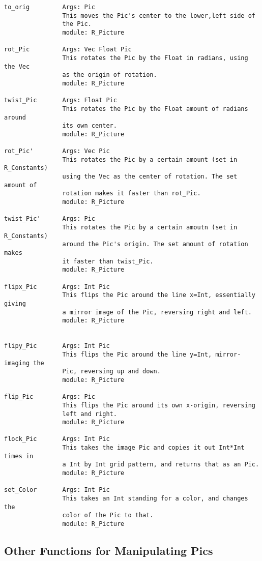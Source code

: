 \begin{verbatim}
to_orig         Args: Pic
                This moves the Pic's center to the lower,left side of
                the Pic. 
                module: R_Picture

rot_Pic         Args: Vec Float Pic
                This rotates the Pic by the Float in radians, using the Vec
                as the origin of rotation.
                module: R_Picture

twist_Pic       Args: Float Pic
                This rotates the Pic by the Float amount of radians around
                its own center. 
                module: R_Picture

rot_Pic'        Args: Vec Pic
                This rotates the Pic by a certain amount (set in R_Constants)
                using the Vec as the center of rotation. The set amount of
                rotation makes it faster than rot_Pic.
                module: R_Picture

twist_Pic'      Args: Pic
                This rotates the Pic by a certain amoutn (set in R_Constants)
                around the Pic's origin. The set amount of rotation makes
                it faster than twist_Pic.
                module: R_Picture

flipx_Pic       Args: Int Pic
                This flips the Pic around the line x=Int, essentially giving
                a mirror image of the Pic, reversing right and left.
                module: R_Picture


flipy_Pic       Args: Int Pic
                This flips the Pic around the line y=Int, mirror-imaging the
                Pic, reversing up and down.
                module: R_Picture

flip_Pic        Args: Pic
                This flips the Pic around its own x-origin, reversing
                left and right. 
                module: R_Picture

flock_Pic       Args: Int Pic
                This takes the image Pic and copies it out Int*Int times in
                a Int by Int grid pattern, and returns that as an Pic.
                module: R_Picture

set_Color       Args: Int Pic
                This takes an Int standing for a color, and changes the
                color of the Pic to that.
                module: R_Picture 
\end{verbatim}

\subsection{Other Functions for Manipulating Pics}


